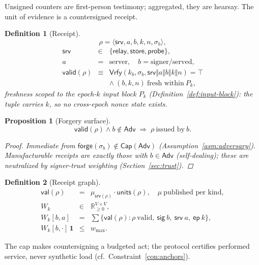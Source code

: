 \documentclass[11pt,letterpaper]{article}
\newtheorem{definition}{Definition}
\newtheorem{proposition}{Proposition}
\begin{document}
Unsigned counters are first-person testimony; aggregated, they are hearsay.
The unit of evidence is a countersigned receipt.

\begin{definition}[Receipt]\label{def:receipt}
\[
\rho=\langle\mathsf{srv},a,b,k,n,\sigma_b\rangle,
\]
\[
\begin{array}{rcl}
\mathsf{srv}&\in&\{\mathsf{relay},\mathsf{store},\mathsf{probe}\},\\
a&=&\text{server},\quad b=\text{signer/served},\\
\mathsf{valid}(\rho)&\equiv&
  \mathsf{Vrfy}(k_b,\sigma_b,\mathsf{srv}\Vert a\Vert b\Vert k\Vert n)=\top\\
&&\land\ (b,k,n)\ \text{fresh within}\ P_k,
\end{array}
\]
freshness scoped to the epoch-$k$ input block $P_k$
(Definition~\ref{def:input-block}): the tuple carries $k$, so no
cross-epoch nonce state exists.
\end{definition}

\begin{proposition}[Forgery surface]\label{prop:forgery}
\[
\mathsf{valid}(\rho)\land b\notin\mathsf{Adv}
\;\Rightarrow\;
\rho\ \text{issued by}\ b.
\]
\begin{proof}
Immediate from
$\mathsf{forge}(\sigma_b)\notin\mathsf{Cap}(\mathsf{Adv})$
(Assumption~\ref{asm:adversary}).  Manufacturable receipts are exactly
those with $b\in\mathsf{Adv}$ (self-dealing); these are neutralized by
signer-trust weighting (Section~\ref{sec:trust}).
\end{proof}
\end{proposition}

\begin{definition}[Receipt graph]\label{def:graph}
\[
\begin{array}{rcl}
\mathsf{val}(\rho)&=&\mu_{\mathsf{srv}(\rho)}\cdot
  \mathsf{units}(\rho),\quad\mu\ \text{published per kind},\\
W_k&\in&\mathbb{R}_{\geq0}^{V\times V},\\
W_k[b,a]&=&\textstyle\sum\{\mathsf{val}(\rho):
  \rho\ \text{valid},\ \mathsf{sig}\ b,\ \mathsf{srv}\ a,\ \mathsf{ep}\ k\},\\
W_k[b,\cdot]\,\mathbf{1}&\leq&w_{\max}.
\end{array}
\]
\end{definition}

The cap makes countersigning a budgeted act; the protocol certifies
performed service, never synthetic load
(cf.\ Constraint~\ref{con:anchors}).
\end{document}
